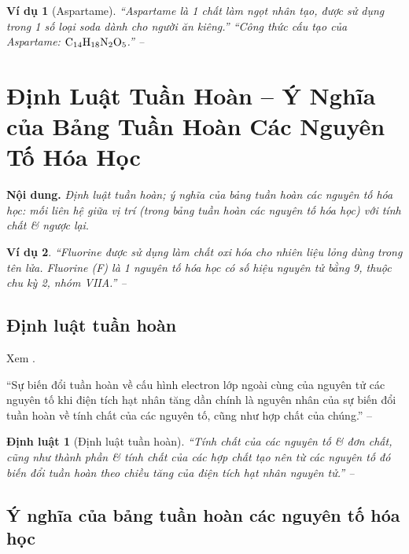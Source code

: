 \documentclass[oneside]{book}
\numberwithin{equation}{section}
\newtheorem{vidu}{Ví dụ}[section]
\newtheorem{dinhluat}{Định luật}[section]
\begin{document}
\begin{vidu}[Aspartame]
	``Aspartame là 1 chất làm ngọt nhân tạo, được sử dụng trong 1 số loại soda dành cho người ăn kiêng.'' ``Công thức cấu tạo của Aspartame: $\rm C_{14}H_{18}N_2O_5$.'' -- \cite[p. 47]{SGK_Hoa_Hoc_10_Chan_Troi_Sang_Tao}
\end{vidu}


\section{Định Luật Tuần Hoàn -- Ý Nghĩa của Bảng Tuần Hoàn Các Nguyên Tố Hóa Học}
\textbf{Nội dung.} \textit{Định luật tuần hoàn; ý nghĩa của bảng tuần hoàn các nguyên tố hóa học: mối liên hệ giữa vị trí (trong bảng tuần hoàn các nguyên tố hóa học) với tính chất \& ngược lại}.

\begin{vidu}
	``Fluorine được sử dụng làm chất oxi hóa cho nhiên liệu lỏng dùng trong tên lửa. Fluorine (F) là 1 nguyên tố hóa học có số hiệu nguyên tử bằng 9, thuộc chu kỳ 2, nhóm VIIA.'' -- \cite[p. 49]{SGK_Hoa_Hoc_10_Chan_Troi_Sang_Tao}
\end{vidu}

\subsection{Định luật tuần hoàn}
Xem \cite[Bảng 7.1: \textsf{Cấu hình electron lớp ngoài cùng của nguyên tử các nguyên tố nhóm A}, p. 49]{SGK_Hoa_Hoc_10_Chan_Troi_Sang_Tao}.

``Sự biến đổi tuần hoàn về cấu hình electron lớp ngoài cùng của nguyên tử các nguyên tố khi điện tích hạt nhân tăng dần chính là nguyên nhân của sự biến đổi tuần hoàn về tính chất của các nguyên tố, cũng như hợp chất của chúng.'' -- \cite[p. 50]{SGK_Hoa_Hoc_10_Chan_Troi_Sang_Tao}

\begin{dinhluat}[Định luật tuần hoàn]
	``Tính chất của các nguyên tố \& đơn chất, cũng như thành phần \& tính chất của các hợp chất tạo nên từ các nguyên tố đó biến đổi tuần hoàn theo chiều tăng của điện tích hạt nhân nguyên tử.'' -- \cite[p. 50]{SGK_Hoa_Hoc_10_Chan_Troi_Sang_Tao}
\end{dinhluat}

\subsection{Ý nghĩa của bảng tuần hoàn các nguyên tố hóa học}
\end{document}
